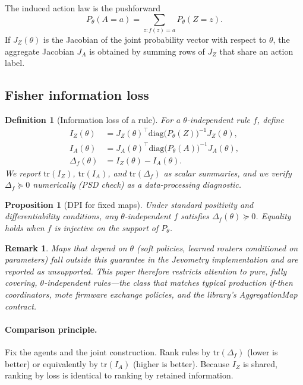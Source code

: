 \documentclass[11pt,a4paper]{article}
\newtheorem{definition}{Definition}
\newtheorem{proposition}{Proposition}
\newtheorem{remark}{Remark}
\begin{document}
The induced action law is the pushforward
\begin{equation}
  P_\theta(A=a)=\sum_{z:f(z)=a} P_\theta(Z=z).
\end{equation}
If $J_Z(\theta)$ is the Jacobian of the joint probability vector with respect
to $\theta$, the aggregate Jacobian $J_A$ is obtained by summing rows of
$J_Z$ that share an action label.

\subsection{Fisher information loss}

\begin{definition}[Information loss of a rule]
For a $\theta$-independent rule $f$, define
\begin{align}
  I_Z(\theta) &= J_Z(\theta)^\top \mathrm{diag}\bigl(P_\theta(Z)\bigr)^{-1} J_Z(\theta),\\
  I_A(\theta) &= J_A(\theta)^\top \mathrm{diag}\bigl(P_\theta(A)\bigr)^{-1} J_A(\theta),\\
  \Delta_f(\theta) &= I_Z(\theta)-I_A(\theta).
\end{align}
We report $\mathrm{tr}(I_Z)$, $\mathrm{tr}(I_A)$, and
$\mathrm{tr}(\Delta_f)$ as scalar summaries, and we verify
$\Delta_f\succeq 0$ numerically (PSD check) as a data-processing diagnostic.
\end{definition}

\begin{proposition}[DPI for fixed maps]
Under standard positivity and differentiability conditions, any
$\theta$-independent $f$ satisfies $\Delta_f(\theta)\succeq 0$. Equality
holds when $f$ is injective on the support of $P_\theta$.
\end{proposition}

\begin{remark}
Maps that depend on $\theta$ (soft policies, learned routers conditioned on
parameters) fall outside this guarantee in the Jevometry implementation and
are reported as unsupported. This paper therefore restricts attention to
pure, fully covering, $\theta$-independent rules---the class that matches
typical production if-then coordinators, mote firmware exchange policies, and
the library's AggregationMap contract.
\end{remark}

\paragraph{Comparison principle.}
Fix the agents and the joint construction. Rank rules by
$\mathrm{tr}(\Delta_f)$ (lower is better) or equivalently by
$\mathrm{tr}(I_A)$ (higher is better). Because $I_Z$ is shared, ranking by
loss is identical to ranking by retained information.
\end{document}
